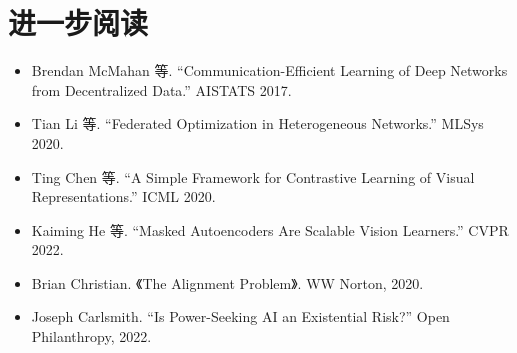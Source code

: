 \documentclass[UTF8,zihao=-4]{ctexart}
\begin{document}
\section*{进一步阅读}
\begin{itemize}
  \item Brendan McMahan 等. ``Communication-Efficient Learning of Deep Networks from Decentralized Data.'' AISTATS 2017.
  \item Tian Li 等. ``Federated Optimization in Heterogeneous Networks.'' MLSys 2020.
  \item Ting Chen 等. ``A Simple Framework for Contrastive Learning of Visual Representations.'' ICML 2020.
  \item Kaiming He 等. ``Masked Autoencoders Are Scalable Vision Learners.'' CVPR 2022.
  \item Brian Christian. 《The Alignment Problem》. WW Norton, 2020.
  \item Joseph Carlsmith. ``Is Power-Seeking AI an Existential Risk?'' Open Philanthropy, 2022.
\end{itemize}
\end{document}
